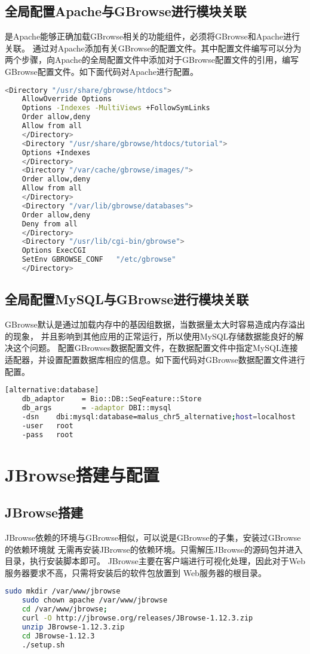 	\subsection{全局配置Apache与GBrowse进行模块关联}
	是Apache能够正确加载GBrowse相关的功能组件，必须将GBrowse和Apache进行关联。
	通过对Apache添加有关GBrowse的配置文件。其中配置文件编写可以分为两个步骤，向Apache的全局配置文件中添加对于GBrowse配置文件的引用，编写GBrowse配置文件。如下面代码对Apache进行配置。
	\begin{lstlisting}[language=bash]
	<Directory "/usr/share/gbrowse/htdocs">
	AllowOverride Options
	Options -Indexes -MultiViews +FollowSymLinks
	Order allow,deny
	Allow from all
	</Directory>
	<Directory "/usr/share/gbrowse/htdocs/tutorial">
	Options +Indexes
	</Directory>
	<Directory "/var/cache/gbrowse/images/">
	Order allow,deny
	Allow from all
	</Directory>
	<Directory "/var/lib/gbrowse/databases">
	Order allow,deny
	Deny from all
	</Directory>
	<Directory "/usr/lib/cgi-bin/gbrowse">
	Options ExecCGI
	SetEnv GBROWSE_CONF   "/etc/gbrowse"
	</Directory>
	\end{lstlisting}
	\subsection{全局配置MySQL与GBrowse进行模块关联}
	GBrowse默认是通过加载内存中的基因组数据，当数据量太大时容易造成内存溢出的现象，
	并且影响到其他应用的正常运行，所以使用MySQL存储数据能良好的解决这个问题。
	配置GBrowses数据配置文件，在数据配置文件中指定MySQL连接适配器，并设置配置数据库相应的信息。如下面代码对GBrowse数据配置文件进行配置。
	\\
	\begin{lstlisting}[language=bash]
	[alternative:database]
	db_adaptor    = Bio::DB::SeqFeature::Store
	db_args       = -adaptor DBI::mysql
	-dsn    dbi:mysql:database=malus_chr5_alternative;host=localhost
	-user   root
	-pass   root
	\end{lstlisting}
	\section{JBrowse搭建与配置}
	\subsection{JBrowse搭建}
	JBrowse依赖的环境与GBrowse相似，可以说是GBrowse的子集，安装过GBrowse的依赖环境就
	无需再安装JBrowse的依赖环境。只需解压JBrowse的源码包并进入目录，执行安装脚本即可。
	JBrowse主要在客户端进行可视化处理，因此对于Web服务器要求不高，只需将安装后的软件包放置到
	Web服务器的根目录。
	\begin{lstlisting}[language=bash]
	sudo mkdir /var/www/jbrowse 
	sudo chown apache /var/www/jbrowse
	cd /var/www/jbrowse;
	curl -O http://jbrowse.org/releases/JBrowse-1.12.3.zip
	unzip JBrowse-1.12.3.zip
	cd JBrowse-1.12.3
	./setup.sh
	\end{lstlisting}
	
